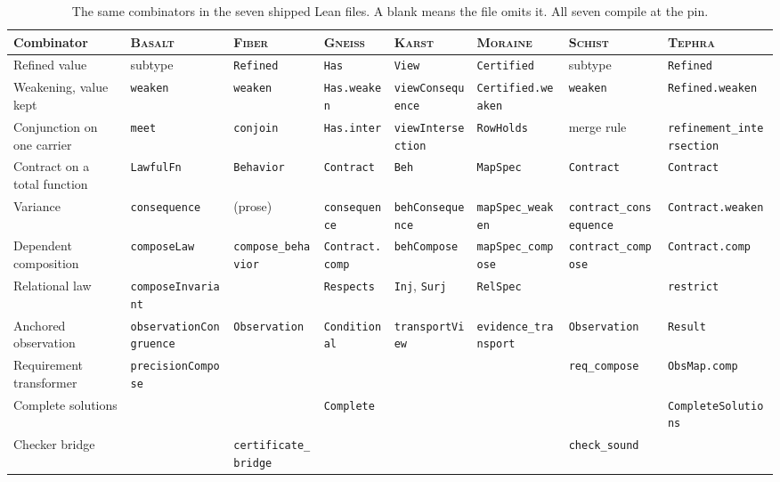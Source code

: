 \documentclass[11pt,a4paper]{article}
\newcommand{\codeb}[1]{\nolinkurl{#1}}
\newcommand{\Bs}{\textsc{Basalt}}
\newcommand{\Fb}{\textsc{Fiber}}
\newcommand{\Gn}{\textsc{Gneiss}}
\newcommand{\Ks}{\textsc{Karst}}
\newcommand{\Mr}{\textsc{Moraine}}
\newcommand{\Sc}{\textsc{Schist}}
\newcommand{\Tp}{\textsc{Tephra}}
\theoremstyle{definition}
\begin{document}
\begin{table}[htbp]
\centering\footnotesize
\caption{The same combinators in the seven shipped Lean files. A blank means the file omits it. All seven compile at the pin.}
\label{tab:corenames}
\begin{tabularx}{\textwidth}{@{}L{22mm}L{14mm}L{15mm}L{14mm}L{15mm}L{15mm}L{15mm}L{14mm}@{}}
\toprule
Combinator & \Bs & \Fb & \Gn & \Ks & \Mr & \Sc & \Tp\\
\midrule
Refined value & subtype & \codeb{Refined} & \codeb{Has} & \codeb{View} & \codeb{Certified} & subtype & \codeb{Refined}\\
Weakening, value kept & \codeb{weaken} & \codeb{weaken} & \codeb{Has.weaken} & \codeb{viewConsequence} & \codeb{Certified.weaken} & \codeb{weaken} & \codeb{Refined.weaken}\\
Conjunction on one carrier & \codeb{meet} & \codeb{conjoin} & \codeb{Has.inter} & \codeb{viewIntersection} & \codeb{RowHolds} & merge rule & \codeb{refinement_intersection}\\
Contract on a total function & \codeb{LawfulFn} & \codeb{Behavior} & \codeb{Contract} & \codeb{Beh} & \codeb{MapSpec} & \codeb{Contract} & \codeb{Contract}\\
Variance & \codeb{consequence} & (prose) & \codeb{consequence} & \codeb{behConsequence} & \codeb{mapSpec_weaken} & \codeb{contract_consequence} & \codeb{Contract.weaken}\\
Dependent composition & \codeb{composeLaw} & \codeb{compose_behavior} & \codeb{Contract.comp} & \codeb{behCompose} & \codeb{mapSpec_compose} & \codeb{contract_compose} & \codeb{Contract.comp}\\
Relational law & \codeb{composeInvariant} & & \codeb{Respects} & \codeb{Inj}, \codeb{Surj} & \codeb{RelSpec} & & \codeb{restrict}\\
Anchored observation & \codeb{observationCongruence} & \codeb{Observation} & \codeb{Conditional} & \codeb{transportView} & \codeb{evidence_transport} & \codeb{Observation} & \codeb{Result}\\
Requirement transformer & \codeb{precisionCompose} & & & & & \codeb{req_compose} & \codeb{ObsMap.comp}\\
Complete solutions & & & \codeb{Complete} & & & & \codeb{CompleteSolutions}\\
Checker bridge & & \codeb{certificate_bridge} & & & & \codeb{check_sound} & \\
\bottomrule
\end{tabularx}
\end{table}
\end{document}
